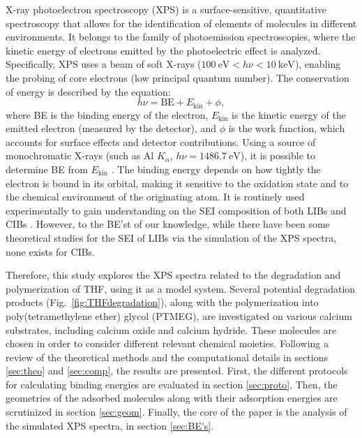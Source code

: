 \documentclass[%
aip,
amsmath,amssymb,
preprint,%
jcp,
showkeys,
]{revtex4-2}
\begin{document}
X-ray photoelectron spectroscopy (XPS) is a surface-sensitive, quantitative spectroscopy that allows for the identification of elements of molecules in different environments. It belongs to the family of photoemission spectroscopies, where the kinetic energy of electrons emitted by the photoelectric effect is analyzed. Specifically, XPS uses a beam of soft X-rays ($\SI{100}{\electronvolt} < h\nu < \SI{10}{\kilo\electronvolt}$), enabling the probing of core electrons (low principal quantum number).\cite{stevieIntroductionXrayPhotoelectron2020} The conservation of energy is described by the equation:
\begin{equation}
	h\nu = \text{BE} + E_{\text{kin}} + \phi, \label{eq:xps}
\end{equation}
where BE is the binding energy of the electron, $E_{\text{kin}}$ is the kinetic energy of the emitted electron (measured by the detector), and $\phi$ is the work function, which accounts for surface effects and detector contributions. Using a source of monochromatic X-rays (such as Al $K_\alpha$, $h\nu = \SI{1486.7}{\electronvolt}$), it is possible to determine BE from $E_{\text{kin}}$ \cite{stevieIntroductionXrayPhotoelectron2020}. The binding energy depends on how tightly the electron is bound in its orbital, making it sensitive to the oxidation state and to the chemical environment of the originating atom. It is routinely used experimentally to gain understanding on the SEI composition of both LIBs and CIBs \cite{forero-saboyaUnderstandingNaturePassivation2020a,songElectrolyteOptimizationInterphase2022,bodinBoronBasedFunctionalAdditives2023,melemedImpactDifferentialCa22023,linDecipheringDynamicInterfacial2024}. However, to the BE'st of our knowledge, while there have been some theoretical studies for the SEI of LIBs via the simulation of the XPS spectra\cite{ebadiInsightsLiMetalOrganic2019}, none exists for CIBs.

Therefore, this study explores the XPS spectra related to the degradation and polymerization of THF, using it as a model system. Several potential degradation products (Fig.~\ref{fig:THFdegradation}), along with the polymerization into poly(tetramethylene ether) glycol (PTMEG), are investigated on various calcium substrates, including calcium oxide and calcium hydride. These molecules are chosen in order to consider different relevant chemical moieties. Following a review of the theoretical methods and the computational details in sections \ref{sec:theo} and \ref{sec:comp}, the results are presented. First, the different protocols for calculating binding energies are evaluated in section \ref{sec:proto}. Then, the geometries of the adsorbed molecules along with their adsorption energies are scrutinized in section \ref{sec:geom}. Finally, the core of the paper is the analysis of the simulated XPS spectra, in section \ref{sec:BE's}.
\end{document}
